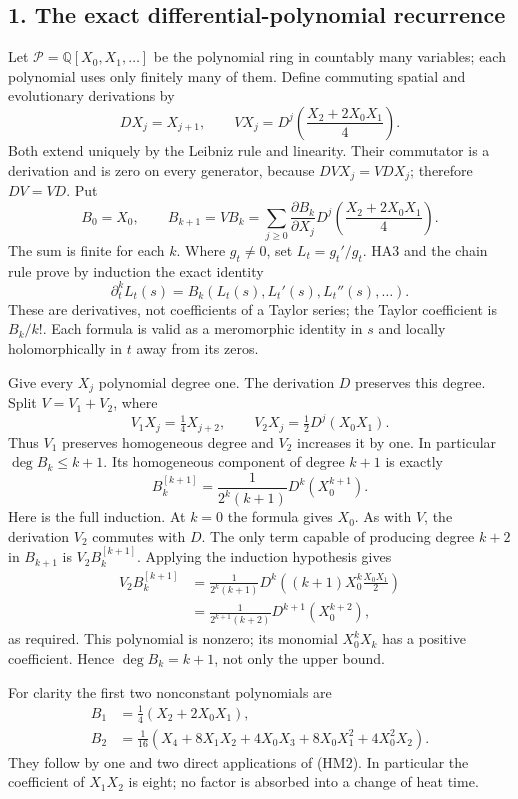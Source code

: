 \documentclass[
  10pt,
  a4paper,
]{article}
\begin{document}
\subsection{1. The exact differential-polynomial
recurrence}\label{the-exact-differential-polynomial-recurrence}

Let \(\mathscr P=\mathbb Q[X_0,X_1,\ldots]\) be the polynomial ring in
countably many variables; each polynomial uses only finitely many of
them. Define commuting spatial and evolutionary derivations by \[
D X_j=X_{j+1},\qquad
V X_j=D^j\!\left(\frac{X_2+2X_0X_1}{4}\right).
\tag{HM1}
\] Both extend uniquely by the Leibniz rule and linearity. Their
commutator is a derivation and is zero on every generator, because
\(DVX_j=VDX_j\); therefore \(DV=VD\). Put \[
B_0=X_0,\qquad B_{k+1}=VB_k
=\sum_{j\ge0}\frac{\partial B_k}{\partial X_j}
D^j\!\left(\frac{X_2+2X_0X_1}{4}\right).
\tag{HM2}
\] The sum is finite for each \(k\). Where \(g_t\ne0\), set
\(L_t=g_t'/g_t\). HA3 and the chain rule prove by induction the exact
identity \[
\partial_t^kL_t(s)=B_k(L_t(s),L_t'(s),L_t''(s),\ldots).
\tag{HM3}
\] These are derivatives, not coefficients of a Taylor series; the
Taylor coefficient is \(B_k/k!\). Each formula is valid as a meromorphic
identity in \(s\) and locally holomorphically in \(t\) away from its
zeros.

Give every \(X_j\) polynomial degree one. The derivation \(D\) preserves
this degree. Split \(V=V_1+V_2\), where \[
V_1X_j=\tfrac14X_{j+2},\qquad
V_2X_j=\tfrac12D^j(X_0X_1).
\tag{HM4}
\] Thus \(V_1\) preserves homogeneous degree and \(V_2\) increases it by
one. In particular \(\deg B_k\le k+1\). Its homogeneous component of
degree \(k+1\) is exactly \[
\boxed{B_k^{[k+1]}=\frac1{2^k(k+1)}D^k(X_0^{k+1}).}
\tag{HM5}
\] Here is the full induction. At \(k=0\) the formula gives \(X_0\). As
with \(V\), the derivation \(V_2\) commutes with \(D\). The only term
capable of producing degree \(k+2\) in \(B_{k+1}\) is
\(V_2B_k^{[k+1]}\). Applying the induction hypothesis gives \[
\begin{split}
V_2B_k^{[k+1]}
&=\frac1{2^k(k+1)}D^k\!\left((k+1)X_0^k\frac{X_0X_1}{2}\right)\\
&=\frac1{2^{k+1}(k+2)}D^{k+1}(X_0^{k+2}),
\end{split}\tag{HM6}
\] as required. This polynomial is nonzero; its monomial \(X_0^kX_k\)
has a positive coefficient. Hence \(\deg B_k=k+1\), not only the upper
bound.

For clarity the first two nonconstant polynomials are \[
\begin{split}
B_1&=\frac14(X_2+2X_0X_1),\\
B_2&=\frac1{16}\left(X_4+8X_1X_2+4X_0X_3
+8X_0X_1^2+4X_0^2X_2\right).
\end{split}\tag{HM7}
\] They follow by one and two direct applications of (HM2). In
particular the coefficient of \(X_1X_2\) is eight; no factor is absorbed
into a change of heat time.
\end{document}
